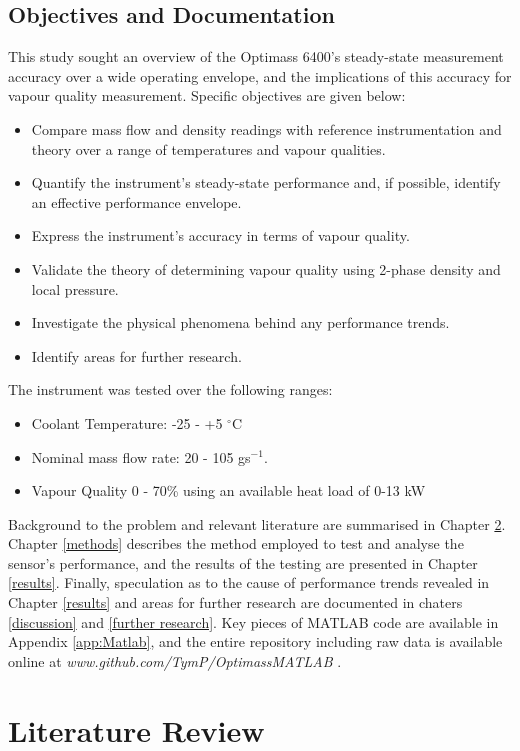 \documentclass{report}
\begin{document}
\section{Objectives and Documentation}
This study sought an overview of the Optimass 6400's steady-state measurement accuracy over a wide operating envelope, and the implications of this accuracy for vapour quality measurement. Specific objectives are given below:
\begin{itemize}
\item{Compare mass flow and density readings with reference instrumentation and theory over a range of temperatures and vapour qualities.}
\item{Quantify the instrument's steady-state performance and, if possible, identify an effective performance envelope.}
\item{Express the instrument's accuracy in terms of vapour quality.}
\item{Validate the theory of determining vapour quality using 2-phase density and local pressure.}
\item{Investigate the physical phenomena behind any performance trends.}
\item{Identify areas for further research.}
\end{itemize}
The instrument was tested over the following ranges:
\begin{itemize}
\item{Coolant Temperature: -25 - +5 $^\circ$C}
\item{Nominal mass flow rate: 20 - 105 gs$^{-1}$.}
\item{Vapour Quality 0 - 70\% using an available heat load of 0-13 kW}
\end{itemize}
Background to the problem and relevant literature are summarised in Chapter \ref{litReview}. Chapter \ref{methods} describes the method employed to test and analyse the sensor's performance, and the results of the testing are presented in Chapter \ref{results}. Finally, speculation as to the cause of performance trends revealed in Chapter \ref{results} and areas for further research are documented in chaters \ref{discussion} and \ref{further research}. Key pieces of MATLAB code are available in Appendix \ref{app:Matlab}, and the entire repository including raw data is available online at \textit{www.github.com/TymP/OptimassMATLAB} .


\chapter{Literature Review} \label{litReview}
\FloatBarrier
\end{document}
